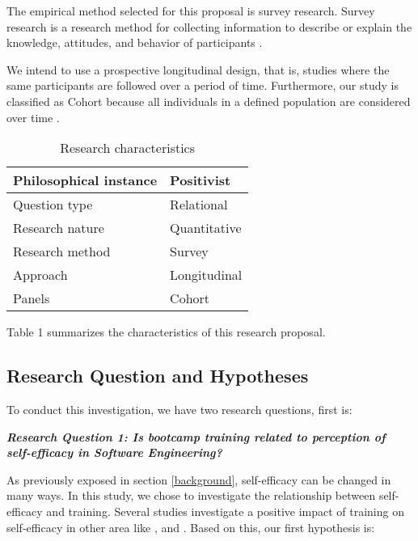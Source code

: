 \documentclass[10pt, conference]{IEEEtran}
\begin{document}
The empirical method selected for this proposal is survey research. Survey research is a research method for collecting information to describe or explain the knowledge, attitudes, and behavior of participants \cite{easterbrook2008selecting}. 

We intend to use a prospective longitudinal design, that is, studies where the same participants are followed over a period of time. Furthermore, our study is classified as Cohort because all individuals in a defined population are considered over time \cite{caruana2015longitudinal}.


\begin{table}[h]
\centering
\caption{Research characteristics}
\begin{tabular}{ll}
\hline
Philosophical instance & Positivist   \\ \hline
Question type          & Relational \\ \hline
Research nature        & Quantitative \\ \hline
Research method        & Survey       \\ \hline
Approach               & Longitudinal   \\ \hline
Panels                 & Cohort   \\ \hline
\end{tabular}
\end{table}

Table 1 summarizes the characteristics of this research proposal.

\subsection{Research Question and Hypotheses }

To conduct this investigation, we have two research questions, first is:
 \newline

\textbf{\textit{Research Question 1: Is bootcamp training related to perception of self-efficacy in Software Engineering?}}
 \newline
 
As previously exposed in section \ref{background}, self-efficacy can be changed in many ways. In this study, we chose to investigate the relationship between self-efficacy and training. Several studies investigate a positive impact of training on self-efficacy in other area like \cite{gist1989effects}, \cite{gist1989influence} and \cite{tannenbaum1991meeting}. Based on this, our first hypothesis is:
 \newline
   
\end{document}
